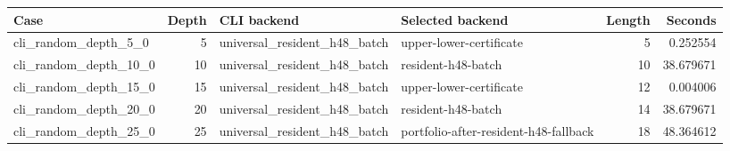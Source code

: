 {\small
\begin{tabular}{lrllrr}
\hline
Case & Depth & CLI backend & Selected backend & Length & Seconds \\
\hline
cli\_random\_depth\_5\_0 & 5 & universal\_resident\_h48\_batch & upper-lower-certificate & 5 & 0.252554 \\
cli\_random\_depth\_10\_0 & 10 & universal\_resident\_h48\_batch & resident-h48-batch & 10 & 38.679671 \\
cli\_random\_depth\_15\_0 & 15 & universal\_resident\_h48\_batch & upper-lower-certificate & 12 & 0.004006 \\
cli\_random\_depth\_20\_0 & 20 & universal\_resident\_h48\_batch & resident-h48-batch & 14 & 38.679671 \\
cli\_random\_depth\_25\_0 & 25 & universal\_resident\_h48\_batch & portfolio-after-resident-h48-fallback & 18 & 48.364612 \\
\hline
\end{tabular}
}
